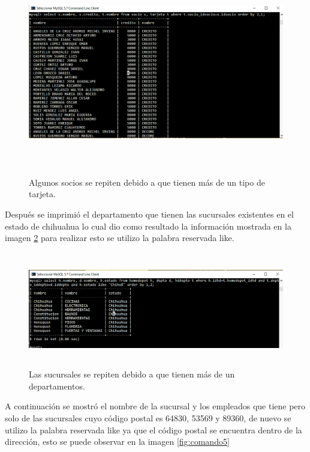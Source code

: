 \documentclass[12pt, titlepage]{article}
\begin{document}
 \begin{figure}[H]
	\begin{center}
		\includegraphics[width=16cm, height=9cm]{img/comando3.png}
		\caption{Algunos socios se repiten debido a que tienen más de un tipo de tarjeta.}
		\label{fig:comando3}
	\end{center}
\end{figure}
Después se imprimió el departamento que tienen las sucursales existentes en el estado de chihuahua lo cual dio como resultado la información mostrada en la imagen \ref{fig:comando4} para realizar esto se utilizo la palabra reservada like.
 \begin{figure}[H]
	\begin{center}
		\includegraphics[width=16cm, height=5cm]{img/comando4.png}
		\caption{Las sucursales se repiten debido a que tienen más de un departamentos.}
		\label{fig:comando4}
	\end{center}
\end{figure}
A continuación se mostró el nombre de la sucursal y los empleados que tiene pero solo de las sucursales cuyo código postal es 64830, 53569 y 89360, de nuevo se utilizo la palabra reservada like ya que el código postal se encuentra dentro de la dirección, esto se puede observar en la imagen \ref{fig:comando5}
\end{document}
